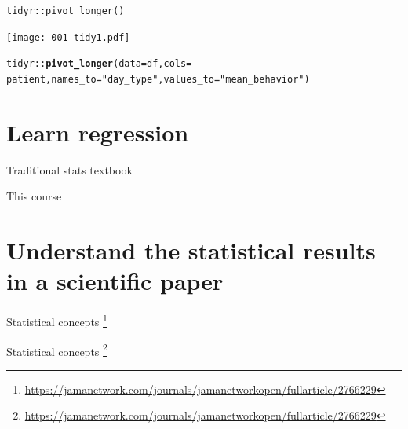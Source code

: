 \documentclass{beamer}\usepackage[]{graphicx}\usepackage[]{color}
\makeatletter
\newcommand{\hlstr}[1]{\textcolor[rgb]{0.192,0.494,0.8}{#1}}%
\newcommand{\hlopt}[1]{\textcolor[rgb]{0,0,0}{#1}}%
\newcommand{\hlstd}[1]{\textcolor[rgb]{0.345,0.345,0.345}{#1}}%
\newcommand{\hlkwc}[1]{\textcolor[rgb]{0.333,0.667,0.333}{#1}}%
\newcommand{\hlkwd}[1]{\textcolor[rgb]{0.737,0.353,0.396}{\textbf{#1}}}%
\newenvironment{kframe}{%
 \def\at@end@of@kframe{}%
 \ifinner\ifhmode%
  \def\at@end@of@kframe{\end{minipage}}%
  \begin{minipage}{\columnwidth}%
 \fi\fi%
 \def\FrameCommand##1{\hskip\@totalleftmargin \hskip-\fboxsep
 \colorbox{shadecolor}{##1}\hskip-\fboxsep
     \hskip-\linewidth \hskip-\@totalleftmargin \hskip\columnwidth}%
 \MakeFramed {\advance\hsize-\width
   \@totalleftmargin\z@ \linewidth\hsize
   \@setminipage}}%
 {\par\unskip\endMakeFramed%
 \at@end@of@kframe}
\newenvironment{knitrout}{}{} %
\makeatother
\begin{document}
\begin{frame}[fragile]{\texttt{tidyr::pivot\_longer()}}
	
	
	
	\texttt{[image: 001-tidy1.pdf]}
	
	
\begin{knitrout}\tiny
{}\color{fgcolor}\begin{kframe}
\begin{alltt}
\hlstd{tidyr}\hlopt{::}\hlkwd{pivot_longer}\hlstd{(}\hlkwc{data} \hlstd{= df,} \hlkwc{cols} \hlstd{=} \hlopt{-}\hlstd{patient,} \hlkwc{names_to} \hlstd{=} \hlstr{"day_type"}\hlstd{,} \hlkwc{values_to} \hlstd{=} \hlstr{"mean_behavior"}\hlstd{)}
\end{alltt}
\end{kframe}
\end{knitrout}
	
	
\end{frame}



\section{Learn regression}


\begin{frame}{Traditional stats textbook}
\end{frame}


\begin{frame}{This course}
\end{frame}


\section{Understand the statistical results in a scientific paper}

\begin{frame}{Statistical concepts}
\footnote{\tiny \url{https://jamanetwork.com/journals/jamanetworkopen/fullarticle/2766229}}
\end{frame}


\begin{frame}{Statistical concepts}
	\footnote{\tiny \url{https://jamanetwork.com/journals/jamanetworkopen/fullarticle/2766229}}
\end{frame}
\end{document}
